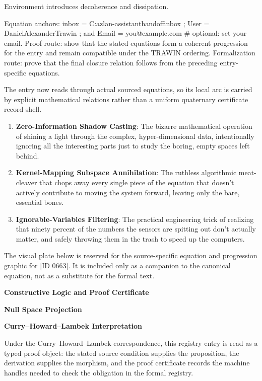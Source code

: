 Environment introduces decoherence and dissipation.

Equation anchors: inbox = C:azlan-assistanthandoffinbox ; User = DanielAlexanderTrawin ; and Email = you@example.com \# optional: set your email. Proof route: show that the stated equations form a coherent progression for the entry and remain compatible under the TRAWIN ordering. Formalization route: prove that the final closure relation follows from the preceding entry-specific equations.

The entry now reads through actual sourced equations, so its local arc is carried by explicit mathematical relations rather than a uniform quaternary certificate record shell.
\endgroup

\begin{enumerate}[leftmargin=1.6em,itemsep=6pt,topsep=4pt]
\item \textbf{Zero-Information Shadow Casting}: The bizarre mathematical operation of shining a light through the complex, hyper-dimensional data, intentionally ignoring all the interesting parts just to study the boring, empty spaces left behind.
\item \textbf{Kernel-Mapping Subspace Annihilation}: The ruthless algorithmic meat-cleaver that chops away every single piece of the equation that doesn't actively contribute to moving the system forward, leaving only the bare, essential bones.
\item \textbf{Ignorable-Variables Filtering}: The practical engineering trick of realizing that ninety percent of the numbers the sensors are spitting out don't actually matter, and safely throwing them in the trash to speed up the computers.
\end{enumerate}

\begingroup\footnotesize\sloppy
The visual plate below is reserved for the source-specific equation and progression graphic for [ID 0663]. It is included only as a companion to the canonical equation, not as a substitute for the formal text.
\par\endgroup
\ifTZPDarkEdition
{}
\fi

\clearpage
\begingroup\tzpsupportsetup
\noindent\textbf{\fontsize{10.8pt}{12.8pt}\selectfont [ID 0663] Constructive Logic and Proof Certificate}\par
\noindent\textbf{\fontsize{10pt}{12pt}\selectfont Null Space Projection}\par
\vspace{0.45em}
\begingroup
\footnotesize
\setlength{\parskip}{0.22em}
\setlength{\parindent}{0pt}
\noindent\textbf{Curry--Howard--Lambek Interpretation}\par
Under the Curry--Howard--Lambek correspondence, this registry entry is read as a typed proof
object: the stated source condition supplies the proposition, the derivation supplies the
morphism, and the proof certificate records the machine handles needed to check the obligation
in the formal registry.


